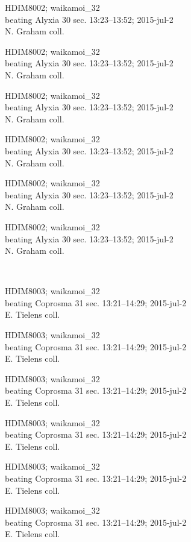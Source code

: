 \documentclass[2pt]{extarticle}
\begin{document}
\noindent
\parbox{0.16\textwidth}{\tiny \raggedright \rule[-0.3\baselineskip]{0pt}{10pt}HDIM8002; waikamoi\_32\\ beating Alyxia 30 sec. 13:23--13:52; 2015-jul-2\\ N. Graham coll.}
\parbox{0.16\textwidth}{\tiny \raggedright \rule[-0.3\baselineskip]{0pt}{10pt}HDIM8002; waikamoi\_32\\ beating Alyxia 30 sec. 13:23--13:52; 2015-jul-2\\ N. Graham coll.}
\parbox{0.16\textwidth}{\tiny \raggedright \rule[-0.3\baselineskip]{0pt}{10pt}HDIM8002; waikamoi\_32\\ beating Alyxia 30 sec. 13:23--13:52; 2015-jul-2\\ N. Graham coll.}
\parbox{0.16\textwidth}{\tiny \raggedright \rule[-0.3\baselineskip]{0pt}{10pt}HDIM8002; waikamoi\_32\\ beating Alyxia 30 sec. 13:23--13:52; 2015-jul-2\\ N. Graham coll.}
\parbox{0.16\textwidth}{\tiny \raggedright \rule[-0.3\baselineskip]{0pt}{10pt}HDIM8002; waikamoi\_32\\ beating Alyxia 30 sec. 13:23--13:52; 2015-jul-2\\ N. Graham coll.}
\parbox{0.16\textwidth}{\tiny \raggedright \rule[-0.3\baselineskip]{0pt}{10pt}HDIM8002; waikamoi\_32\\ beating Alyxia 30 sec. 13:23--13:52; 2015-jul-2\\ N. Graham coll.} \\ 
\vspace{0.001in} 

\noindent
\parbox{0.16\textwidth}{\tiny \raggedright \rule[-0.3\baselineskip]{0pt}{10pt}HDIM8003; waikamoi\_32\\ beating Coprosma 31 sec. 13:21--14:29; 2015-jul-2\\ E. Tielens coll.}
\parbox{0.16\textwidth}{\tiny \raggedright \rule[-0.3\baselineskip]{0pt}{10pt}HDIM8003; waikamoi\_32\\ beating Coprosma 31 sec. 13:21--14:29; 2015-jul-2\\ E. Tielens coll.}
\parbox{0.16\textwidth}{\tiny \raggedright \rule[-0.3\baselineskip]{0pt}{10pt}HDIM8003; waikamoi\_32\\ beating Coprosma 31 sec. 13:21--14:29; 2015-jul-2\\ E. Tielens coll.}
\parbox{0.16\textwidth}{\tiny \raggedright \rule[-0.3\baselineskip]{0pt}{10pt}HDIM8003; waikamoi\_32\\ beating Coprosma 31 sec. 13:21--14:29; 2015-jul-2\\ E. Tielens coll.}
\parbox{0.16\textwidth}{\tiny \raggedright \rule[-0.3\baselineskip]{0pt}{10pt}HDIM8003; waikamoi\_32\\ beating Coprosma 31 sec. 13:21--14:29; 2015-jul-2\\ E. Tielens coll.}
\parbox{0.16\textwidth}{\tiny \raggedright \rule[-0.3\baselineskip]{0pt}{10pt}HDIM8003; waikamoi\_32\\ beating Coprosma 31 sec. 13:21--14:29; 2015-jul-2\\ E. Tielens coll.} \\ 
\vspace{0.001in} 
\end{document}
